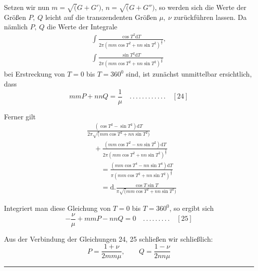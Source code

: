 Setzen wir nun $m=\surd(G+G')$, $n=\surd(G+G'')$, so werden sich die Werte der Größen $P,\ Q$ leicht auf die transzendenten Größen $\mu,\ \nu$ zurückführen lassen. Da nämlich $P,\ Q$ die Werte der Integrale
\[
\begin{gathered}\int\frac{\cos T^2\mathrm{d}T}{2\pi(mm\cos T^2+nn\sin T^2)^{\frac32}},\\[7pt]\int\frac{\sin T^2\mathrm{d}T}{2\pi(mm\cos T^2+nn\sin T^2)^{\frac32}}\end{gathered}
\]
bei Erstreckung von $T=0$ bis $T=360^{0}$ sind, ist zunächst unmittelbar ersichtlich, dass
\[
mmP+nnQ=\frac{1}{\mu}\quad .\, .\, .\, .\, .\, .\, .\, .\, .\, .\, .\, .\quad[24]
\]
\par Ferner gilt
\[
\begin{aligned}
&\frac{(\cos T^2-\sin T^2)\mathrm{d}T}{2\pi\surd(mm\cos T^2+nn\sin T^2)}\\[7pt]&\quad+\frac{(mm\cos T^2-nn\sin T^2)\mathrm{d}T}{2\pi(mm\cos T^2+nn\sin T^2)^{\frac32}}\\[6pt]
&\qquad=\frac{(mm\cos T^4-nn\sin T^4)\mathrm{d}T}{\pi(mm\cos T^2+nn\sin T^2)^{\frac32}}\\[6pt]
&\qquad=\mathrm{d}.\frac{\cos T\sin T}{\pi\surd(mm\cos T^2+nn\sin T^2)}
\end{aligned}
\]
\par Integriert man diese Gleichung von $T=0$ bis $T=360^{0}$, so ergibt sich
\[
-\frac{\nu}{\mu}+mmP-nnQ=0\quad .\, .\, .\, .\, .\, .\, .\, .\, .\quad[25]
\]
\par Aus der Verbindung der Gleichungen 24, 25 schließen wir schließlich:
\[
P=\frac{1+\nu}{2mm\mu},\qquad Q=\frac{1-\nu}{2nn\mu}
\]
\begin{center}\rule{0.22\textwidth}{0.4pt}\end{center}
\clearpage
\endgroup
